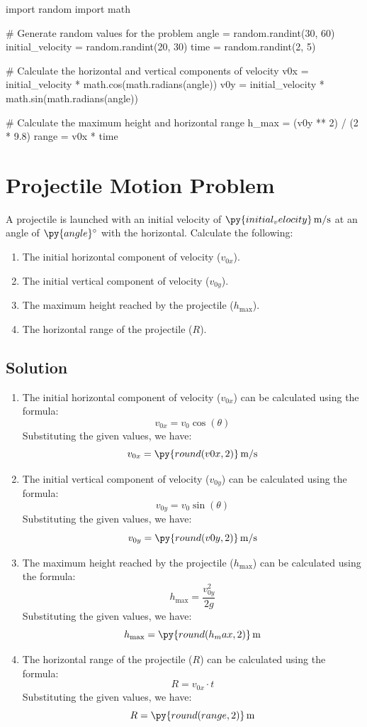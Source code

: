 \documentclass{article}
\begin{document}
\begin{pycode}
import random
import math

# Generate random values for the problem
angle = random.randint(30, 60)
initial_velocity = random.randint(20, 30)
time = random.randint(2, 5)

# Calculate the horizontal and vertical components of velocity
v0x = initial_velocity * math.cos(math.radians(angle))
v0y = initial_velocity * math.sin(math.radians(angle))

# Calculate the maximum height and horizontal range
h_max = (v0y ** 2) / (2 * 9.8)
range = v0x * time

\end{pycode}

\section*{Projectile Motion Problem}

A projectile is launched with an initial velocity of \(\py{initial_velocity}\, \text{m/s}\) at an angle of \(\py{angle}$\degree$\) with the horizontal. Calculate the following:

\begin{enumerate}
    \item The initial horizontal component of velocity (\(v_{0x}\)).
    \item The initial vertical component of velocity (\(v_{0y}\)).
    \item The maximum height reached by the projectile (\(h_{\text{max}}\)).
    \item The horizontal range of the projectile (\(R\)).
\end{enumerate}

\subsection*{Solution}

\begin{enumerate}
    \item The initial horizontal component of velocity (\(v_{0x}\)) can be calculated using the formula:
    \[v_{0x} = v_0 \cos(\theta)\]
    Substituting the given values, we have:
    \[v_{0x} = \py{round(v0x,2)}\, \text{m/s}\]

    \item The initial vertical component of velocity (\(v_{0y}\)) can be calculated using the formula:
    \[v_{0y} = v_0 \sin(\theta)\]
    Substituting the given values, we have:
    \[v_{0y} = \py{round(v0y,2)}\, \text{m/s}\]

    \item The maximum height reached by the projectile (\(h_{\text{max}}\)) can be calculated using the formula:
    \[h_{\text{max}} = \frac{{v_{0y}^2}}{{2g}}\]
    Substituting the given values, we have:
    \[h_{\text{max}} = \py{round(h_max,2)}\, \text{m}\]

    \item The horizontal range of the projectile (\(R\)) can be calculated using the formula:
    \[R = v_{0x} \cdot t\]
    Substituting the given values, we have:
    \[R = \py{round(range,2)}\, \text{m}\]
\end{enumerate}

    
\end{document}
